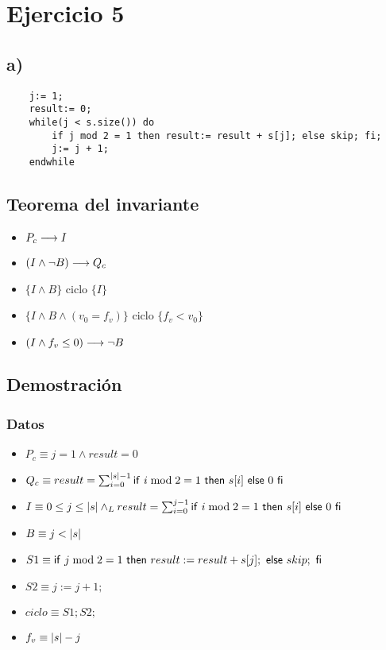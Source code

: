 \documentclass{article}
\begin{document}
\section*{Ejercicio 5}

\subsection*{a)}

\begin{verbatim}
    j:= 1;
    result:= 0;
    while(j < s.size()) do
        if j mod 2 = 1 then result:= result + s[j]; else skip; fi;
        j:= j + 1;
    endwhile
\end{verbatim}

\subsection*{Teorema del invariante}
\begin{itemize}
    \item $P_{c} \longrightarrow I$
    \item $(I \wedge \neg B) \longrightarrow Q_{c}$
    \item $\{I \wedge B\}$ ciclo $\{ I \}$
    \item $\{I \wedge B \wedge (v_{0} = f_{v})\}$ ciclo $\{f_{v} < v_{0}\}$
    \item $(I \wedge f_{v} \leq 0) \longrightarrow \neg B$
\end{itemize}


\subsection*{Demostración}
\subsubsection*{Datos}
\begin{itemize}
    \item $P_{c}    \equiv j = 1 \wedge result = 0$
    \item $Q_{c}    \equiv result = \sum_{i=0}^{|s|-1} \mathsf{if}\ i \bmod 2 = 1\ \mathsf{then}\ s[i]\ \mathsf{else}\ 0\ \mathsf{fi}$
    \item $I        \equiv 0 \leq j \leq |s| \land _L result = \sum_{i=0}^{j-1} \mathsf{if}\ i \bmod 2 = 1\ \mathsf{then}\ s[i]\ \mathsf{else}\ 0\ \mathsf{fi}$
    \item $B        \equiv j < |s|$
    \item $S1       \equiv \mathsf{if}\ j \bmod 2 = 1\ \mathsf{then}\ result:= result + s[j];\ \mathsf{else}\ skip;\ \mathsf{fi}$
    \item $S2       \equiv j:= j + 1;$
    \item $ciclo    \equiv S1;S2;$
    \item $f_{v}    \equiv |s|-j$
\end{itemize}
\end{document}
